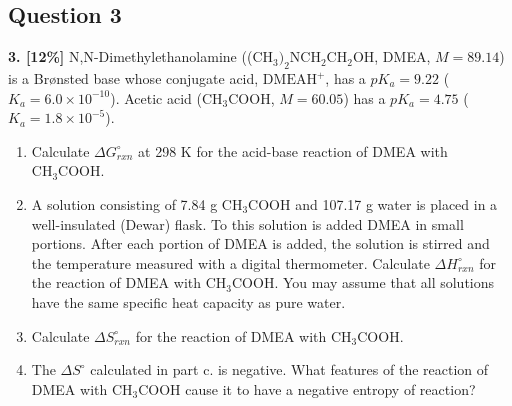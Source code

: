\documentclass[10pt,a4paper]{article}
\begin{document}
\subsection*{Question 3}
\textbf{3. [12\%]} N,N-Dimethylethanolamine (($\text{CH}_3)_2\text{NCH}_2\text{CH}_2\text{OH}$, DMEA, $M=89.14$) is a Brønsted base whose conjugate acid, $\text{DMEAH}^+$, has a $pK_a=9.22$ ($K_a=6.0\times10^{-10}$). Acetic acid ($\text{CH}_3\text{COOH}$, $M=60.05$) has a $pK_a=4.75$ ($K_a=1.8\times10^{-5}$).
\begin{enumerate}[label=\alph*.]
    \vspace{5cm} \item Calculate $\Delta G^\circ_{rxn}$ at 298 K for the acid-base reaction of DMEA with $\text{CH}_3\text{COOH}$.
    \vspace{5cm} \item A solution consisting of 7.84 g $\text{CH}_3\text{COOH}$ and 107.17 g water is placed in a well-insulated (Dewar) flask. To this solution is added DMEA in small portions. After each portion of DMEA is added, the solution is stirred and the temperature measured with a digital thermometer. Calculate $\Delta H^\circ_{rxn}$ for the reaction of DMEA with $\text{CH}_3\text{COOH}$. You may assume that all solutions have the same specific heat capacity as pure water.
    \vspace{5cm} \item Calculate $\Delta S^\circ_{rxn}$ for the reaction of DMEA with $\text{CH}_3\text{COOH}$.
    \vspace{5cm} \item The $\Delta S^\circ$ calculated in part c. is negative. What features of the reaction of DMEA with $\text{CH}_3\text{COOH} $ cause it to have a negative entropy of reaction?
\end{enumerate}
\end{document}
